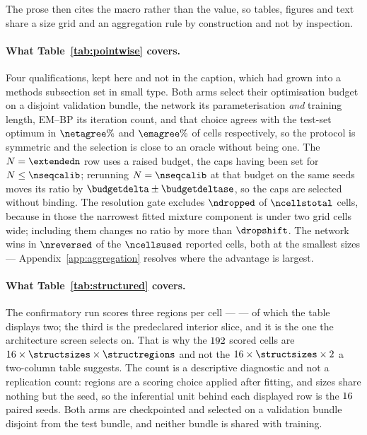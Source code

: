\noindent The prose then cites the macro rather than the value, so tables,
figures and text share a size grid and an aggregation rule by construction
and not by inspection.

\paragraph{What Table~\ref{tab:pointwise} covers.} Four qualifications, kept
here and not in the caption, which had grown into a methods subsection
set in small type. Both arms select their optimisation budget on a disjoint
validation bundle, the network its parameterisation \emph{and} training
length, EM--BP its iteration count, and that choice agrees with the
test-set optimum in $\netagree\%$ and $\emagree\%$ of cells respectively, so
the protocol is symmetric and the selection is close to an oracle without
being one. The $\nseq=\extendedn$ row uses a raised budget, the caps having
been set for $\nseq\le\nseqcalib$; rerunning $\nseq=\nseqcalib$ at that budget
on the same seeds moves its ratio by $\budgetdelta\pm\budgetdeltase$, so the
caps are selected without binding. The resolution gate excludes $\ndropped$ of
$\ncellstotal$ cells, because in those the narrowest fitted mixture component is
under two grid cells wide; including them changes no ratio by more than
$\dropshift$. The network wins in $\nreversed$ of the $\ncellsused$ reported
cells, both at the smallest sizes --- Appendix~\ref{app:aggregation} resolves
where the advantage is largest.

\paragraph{What Table~\ref{tab:structured} covers.} The confirmatory run scores
three regions per cell --- \structregionlist{} --- of which the table displays
two; the third is the predeclared interior slice, and it is the one the
architecture screen selects on. That is why the $192$ scored cells are
$\structseeds \times \structsizes \times \structregions$ and not the
$\structseeds \times \structsizes \times 2$ a two-column table suggests. The
count is a descriptive diagnostic and not a replication count: regions are a
scoring choice applied after fitting, and sizes share nothing but the seed, so
the inferential unit behind each displayed row is the $16$ paired
seeds. Both arms are checkpointed and selected on a validation bundle disjoint
from the test bundle, and neither bundle is shared with training.

